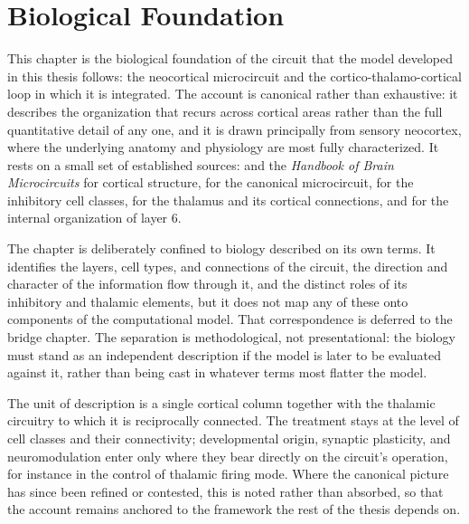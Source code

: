 \usetikzlibrary{arrows.meta}
\providecommand{\unitname}{chapter}
\chapter{Biological Foundation}
\label{chap:bio}

This \unitname{} is the biological foundation of the circuit that the model developed in this thesis follows: the neocortical microcircuit 
and the cortico-thalamo-cortical loop in which it is integrated. The account is canonical rather than exhaustive: it describes the 
organization that recurs across cortical areas rather than the full quantitative detail of any one, and it is drawn principally from 
sensory neocortex, where the underlying anatomy and physiology are most fully characterized. It rests on a small set of established 
sources: \textcite{white1989} and the \emph{Handbook of Brain Microcircuits} \parencite{shepherd2018} for cortical structure, 
\textcite{douglas1989, douglas2004} for the canonical microcircuit, \textcite{rudy2011} for the inhibitory cell classes, 
\textcite{sherman1998, sherman2013} for the thalamus and its cortical connections, and \textcite{thomson2010layer6} for the internal organization of layer 6.

The \unitname{} is deliberately confined to biology described on its own terms. It identifies the layers, cell types, and connections of 
the circuit, the direction and character of the information flow through it, and the distinct roles of its inhibitory and thalamic 
elements, but it does not map any of these onto components of the computational model. That correspondence is deferred to the bridge 
chapter. The separation is methodological, not presentational: the biology must stand as an independent description if the model is 
later to be evaluated against it, rather than being cast in whatever terms most flatter the model.

The unit of description is a single cortical column together with the thalamic circuitry to which it is reciprocally connected. The 
treatment stays at the level of cell classes and their connectivity; developmental origin, synaptic plasticity, and neuromodulation 
enter only where they bear directly on the circuit's operation, for instance in the control of thalamic firing mode. Where the 
canonical picture has since been refined or contested, this is noted rather than absorbed, so that the account remains anchored to 
the framework the rest of the thesis depends on.

